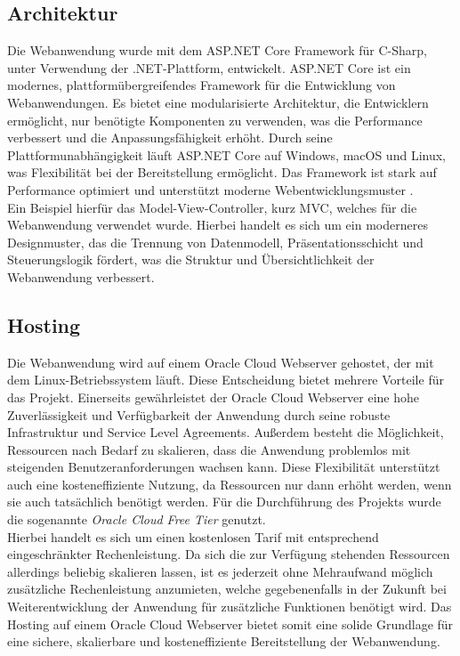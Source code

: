 \documentclass[conference]{IEEEtran}
\begin{document}
\subsection{Architektur}
Die Webanwendung wurde mit dem ASP.NET Core Framework für C-Sharp, unter Verwendung der .NET-Plattform, entwickelt. ASP.NET Core ist ein modernes, plattformübergreifendes Framework für die Entwicklung von Webanwendungen. Es bietet eine modularisierte Architektur, die Entwicklern ermöglicht, nur benötigte Komponenten zu verwenden, was die Performance verbessert und die Anpassungsfähigkeit erhöht. Durch seine Plattformunabhängigkeit läuft ASP.NET Core auf Windows, macOS und Linux, was Flexibilität bei der Bereitstellung ermöglicht. Das Framework ist stark auf Performance optimiert und unterstützt moderne Webentwicklungsmuster \cite{dotNET} \cite{csharp}. \\
Ein Beispiel hierfür das Model-View-Controller, kurz MVC, welches für die Webanwendung verwendet wurde. Hierbei handelt es sich um ein moderneres Designmuster, das die Trennung von Datenmodell, Präsentationsschicht und Steuerungslogik fördert, was die Struktur und Übersichtlichkeit der Webanwendung verbessert.
\subsection{Hosting}
Die Webanwendung wird auf einem Oracle Cloud Webserver gehostet, der mit dem Linux-Betriebssystem läuft. Diese Entscheidung bietet mehrere Vorteile für das Projekt. Einerseits gewährleistet der Oracle Cloud Webserver eine hohe Zuverlässigkeit und Verfügbarkeit der Anwendung durch seine robuste Infrastruktur und Service Level Agreements. Außerdem besteht die Möglichkeit, Ressourcen nach Bedarf zu skalieren, dass die Anwendung problemlos mit steigenden Benutzeranforderungen wachsen kann. Diese Flexibilität unterstützt auch eine kosteneffiziente Nutzung, da Ressourcen nur dann erhöht werden, wenn sie auch tatsächlich benötigt werden. Für die Durchführung des Projekts wurde die sogenannte \textit{Oracle Cloud Free Tier} genutzt. \\
Hierbei handelt es sich um einen kostenlosen Tarif mit entsprechend eingeschränkter Rechenleistung. Da sich die zur Verfügung stehenden Ressourcen allerdings beliebig skalieren lassen, ist es jederzeit ohne Mehraufwand möglich zusätzliche Rechenleistung anzumieten, welche gegebenenfalls in der Zukunft bei Weiterentwicklung der Anwendung für zusätzliche Funktionen benötigt wird. Das Hosting auf einem Oracle Cloud Webserver bietet somit eine solide Grundlage für eine sichere, skalierbare und kosteneffiziente Bereitstellung der Webanwendung. \\
\end{document}
